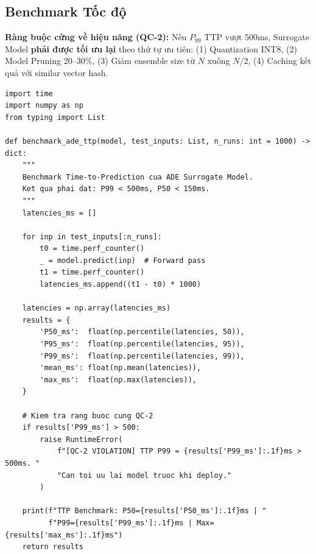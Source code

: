 \subsection{Benchmark Tốc độ}

\begin{tcolorbox}[dangerbox]
\textbf{Ràng buộc cứng về hiệu năng (QC-2):} Nếu $P_{99}$ TTP vượt 500ms, Surrogate Model \textbf{phải được tối ưu lại} theo thứ tự ưu tiên: (1) Quantization INT8, (2) Model Pruning 20--30\%, (3) Giảm ensemble size từ $N$ xuống $N/2$, (4) Caching kết quả với similar vector hash.
\end{tcolorbox}

\begin{lstlisting}[caption={Benchmark TTP với percentile đo lường},label={lst:benchmark}]
import time
import numpy as np
from typing import List

def benchmark_ade_ttp(model, test_inputs: List, n_runs: int = 1000) -> dict:
    """
    Benchmark Time-to-Prediction cua ADE Surrogate Model.
    Ket qua phai dat: P99 < 500ms, P50 < 150ms.
    """
    latencies_ms = []

    for inp in test_inputs[:n_runs]:
        t0 = time.perf_counter()
        _ = model.predict(inp)  # Forward pass
        t1 = time.perf_counter()
        latencies_ms.append((t1 - t0) * 1000)

    latencies = np.array(latencies_ms)
    results = {
        'P50_ms':  float(np.percentile(latencies, 50)),
        'P95_ms':  float(np.percentile(latencies, 95)),
        'P99_ms':  float(np.percentile(latencies, 99)),
        'mean_ms': float(np.mean(latencies)),
        'max_ms':  float(np.max(latencies)),
    }

    # Kiem tra rang buoc cung QC-2
    if results['P99_ms'] > 500:
        raise RuntimeError(
            f"[QC-2 VIOLATION] TTP P99 = {results['P99_ms']:.1f}ms > 500ms. "
            "Can toi uu lai model truoc khi deploy."
        )

    print(f"TTP Benchmark: P50={results['P50_ms']:.1f}ms | "
          f"P99={results['P99_ms']:.1f}ms | Max={results['max_ms']:.1f}ms")
    return results
\end{lstlisting}
